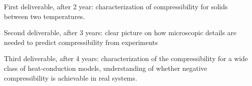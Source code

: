 \begin{workpackage}
\begin{tasklist}
\end{tasklist}

\begin{wpdelivs}
  \begin{wpdeliv}[due=24,id=mydeliv1,dissem=PU,nature=DEM,lead=UNIPD]
      {First deliverable, after 2 year: characterization of compressibility for solids between two temperatures.}
  \end{wpdeliv}
  \begin{wpdeliv}[due=36,id=mydeliv2,dissem=PU,nature=DEM,lead=UNIPD]
      {Second deliverable, after 3 years: clear picture on how microscopic details are needed to predict compressibility from experiments}
  \end{wpdeliv}
  \begin{wpdeliv}[due=48,id=mydeliv3,dissem=PU,nature=DEM,lead=UNIPD]
      {Third deliverable, after 4 years: characterization of the compressibility for a wide class of heat-conduction models, understanding of whether negative compressibility is achievable in real systems.}
\end{wpdeliv}
\end{wpdelivs}




\end{workpackage}
